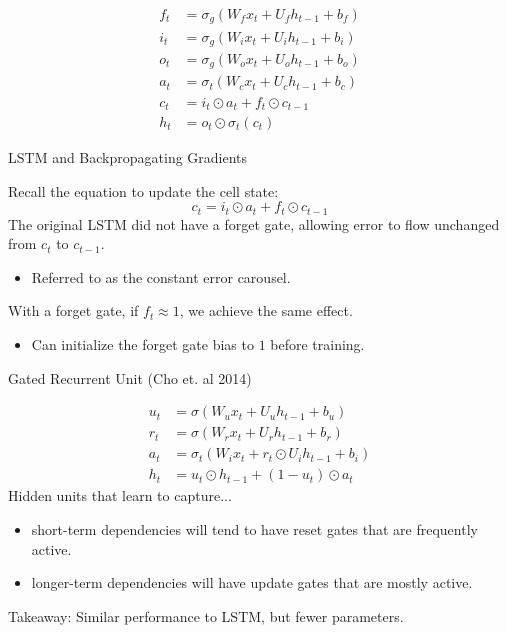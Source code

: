 \documentclass[english]{article}
\begin{document}
\begin{align*}
f_t &= \sigma_g(W_fx_t+U_fh_{t-1}+b_f)\\
i_t &= \sigma_g(W_ix_t+U_ih_{t-1}+b_i)\\
o_t &= \sigma_g(W_ox_t+U_oh_{t-1}+b_o)\\
a_t &= \sigma_t(W_cx_t+U_ch_{t-1}+b_c)\\
c_t &= i_t\odot a_t +f_t\odot c_{t-1}\\
h_t &= o_t\odot \sigma_t(c_t)
\end{align*}
 

\item 
 {LSTM and Backpropagating Gradients}

Recall the equation to update the cell state:
$$c_t = i_t\odot a_t +f_t\odot c_{t-1}$$
The original LSTM did not have a forget gate, allowing error to flow unchanged from $c_t$ to $c_{t-1}$.
\begin{itemize}
\item Referred to as the constant error carousel.
\end{itemize}
With a forget gate, if $f_t\approx 1$, we achieve the same effect.
\begin{itemize}
\item Can initialize the forget gate bias to $1$ before training.
\end{itemize}
 

\item 
 {Gated Recurrent Unit (Cho et. al 2014)}


\begin{align*}
u_t &= \sigma(W_ux_t+U_uh_{t-1}+b_u)\\
r_t &= \sigma(W_rx_t+U_rh_{t-1}+b_r)\\
a_t &= \sigma_t(W_ix_t+r_t\odot U_ih_{t-1}+b_i)\\
h_t &= u_t\odot h_{t-1} + (1-u_t)\odot a_t
\end{align*}
Hidden units that learn to capture...
\begin{itemize}
\item short-term dependencies will tend to have reset gates that are frequently active. 
\item longer-term dependencies will have update gates that are mostly active.
\end{itemize}
Takeaway: Similar performance to LSTM, but fewer parameters.
 \eenum
 
\end{document}
